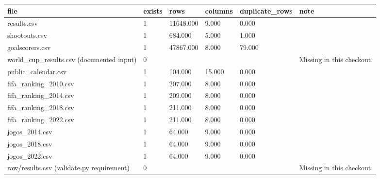 \begin{tabular}{llllll}
\toprule
file & exists & rows & columns & duplicate\_rows & note \\
\midrule
results.csv & 1 & 11648.000 & 9.000 & 0.000 &  \\
shootouts.csv & 1 & 684.000 & 5.000 & 1.000 &  \\
goalscorers.csv & 1 & 47867.000 & 8.000 & 79.000 &  \\
world\_cup\_results.csv (documented input) & 0 &  &  &  & Missing in this checkout. \\
public\_calendar.csv & 1 & 104.000 & 15.000 & 0.000 &  \\
fifa\_ranking\_2010.csv & 1 & 207.000 & 8.000 & 0.000 &  \\
fifa\_ranking\_2014.csv & 1 & 209.000 & 8.000 & 0.000 &  \\
fifa\_ranking\_2018.csv & 1 & 211.000 & 8.000 & 0.000 &  \\
fifa\_ranking\_2022.csv & 1 & 211.000 & 8.000 & 0.000 &  \\
jogos\_2014.csv & 1 & 64.000 & 9.000 & 0.000 &  \\
jogos\_2018.csv & 1 & 64.000 & 9.000 & 0.000 &  \\
jogos\_2022.csv & 1 & 64.000 & 9.000 & 0.000 &  \\
raw/results.csv (validate.py requirement) & 0 &  &  &  & Missing in this checkout. \\
\bottomrule
\end{tabular}
